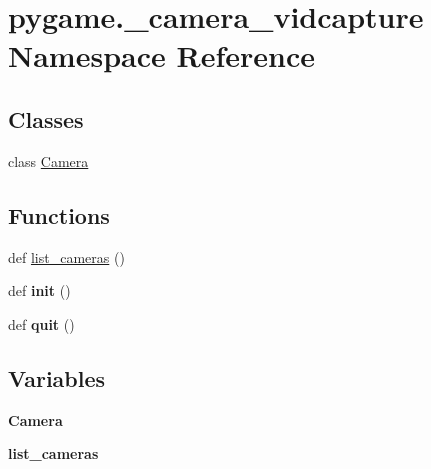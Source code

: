 \hypertarget{namespacepygame_1_1__camera__vidcapture}{}\section{pygame.\+\_\+camera\+\_\+vidcapture Namespace Reference}
\label{namespacepygame_1_1__camera__vidcapture}
\subsection*{Classes}
\begin{DoxyCompactItemize}
\item 
class \hyperlink{classpygame_1_1__camera__vidcapture_1_1_camera}{Camera}
\end{DoxyCompactItemize}
\subsection*{Functions}
\begin{DoxyCompactItemize}
\item 
def \hyperlink{namespacepygame_1_1__camera__vidcapture_afcc113b39d566be7ff65ddb13d283ff3}{list\+\_\+cameras} ()
\item 
\mbox{\label{namespacepygame_1_1__camera__vidcapture_ab87c1e584831a4832e21e1772d5a2ba1}} 
def {\bfseries init} ()
\item 
\mbox{\label{namespacepygame_1_1__camera__vidcapture_a85ecbeb1710c102b8b07086f63fc1777}} 
def {\bfseries quit} ()
\end{DoxyCompactItemize}
\subsection*{Variables}
\begin{DoxyCompactItemize}
\item 
\mbox{\label{namespacepygame_1_1__camera__vidcapture_ad313b480e52f94a999d4795e82041851}} 
{\bfseries Camera}
\item 
\mbox{\label{namespacepygame_1_1__camera__vidcapture_a92b975bb2b3ab0f097228b1ce64487b0}} 
{\bfseries list\+\_\+cameras}
\end{DoxyCompactItemize}


